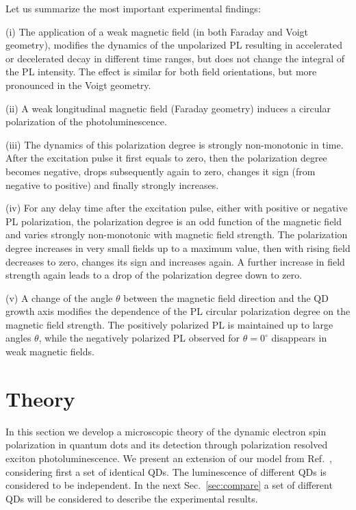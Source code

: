\documentclass[twocolumn,showpacs,preprintnumbers,amsmath,amssymb,aps]{revtex4-1}
\begin{document}
Let us summarize the most important experimental findings:

(i) The application of a weak magnetic field (in both Faraday and
Voigt geometry), modifies the dynamics of the unpolarized PL resulting
in accelerated or decelerated decay in different time ranges,
but does not change the integral of the PL intensity. The effect is similar for
both field orientations, but more pronounced in the Voigt geometry.

(ii) A weak longitudinal magnetic field (Faraday geometry) induces
a circular polarization of the photoluminescence.

(iii) The dynamics of this polarization degree is strongly
non-monotonic in time. After the excitation pulse it first equals to zero, then
the polarization degree becomes negative, drops subsequently again
to zero, changes it sign (from negative to positive) and finally
strongly increases.

(iv) For any delay time after the excitation pulse, either with positive or negative PL polarization, the polarization degree is an odd function of the magnetic field and
varies strongly non-monotonic with magnetic field strength. The polarization degree
increases in very small fields up to a maximum value, then with
rising field decreases to zero, changes its sign and
increases again. A further increase in field strength again leads to
a drop of the polarization degree down to zero.

(v) A change of the angle $\theta$ between the magnetic field
direction and the QD growth axis modifies the dependence of the PL
circular polarization degree on the magnetic field strength. The
positively polarized PL is maintained up to large angles $\theta$,
while the negatively polarized PL observed for $\theta=0^{\circ}$ disappears in
weak magnetic fields.

\section{Theory}
\label{sec:theory}

In this section we develop a microscopic theory of the dynamic electron
spin polarization in quantum dots and its detection through
polarization resolved exciton photoluminescence. We present an
extension of our model from Ref.~,
considering first a set of identical QDs. The luminescence of
different QDs is considered to be independent. In the next
Sec.~\ref{sec:compare} a set of different QDs will be considered to
describe the experimental results.
\end{document}
